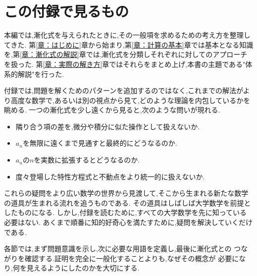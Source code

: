 \section{この付録で見るもの}

本編では,漸化式を与えられたときに,その一般項を求めるための考え方を整理してきた.
第\ref{章：はじめに}章から始まり,第\ref{章：計算の基本}章では基本となる知識を,第\ref{章：漸化式の解説}章では,漸化式を分類しそれぞれに対してのアプローチを扱った.
第\ref{章：実際の解き方}章ではそれらをまとめ上げ,本書の主題である"体系的解説"を行った.

付録では,問題を解くためのパターンを追加するのではなく,これまでの解法がより高度な数学で,あるいは別の視点から見て,どのような理論を内包しているかを眺める.
一つの漸化式を少し遠くから見ると,次のような問いが現れる.

\begin{itemize}
  \item 隣り合う項の差を,微分や積分に似た操作として扱えないか.
  \item $a_n$を無限に遠くまで見通すと最終的にどうなるのか.
  \item $a_n$の$n$を実数に拡張するとどうなるのか.
  \item 度々登場した特性方程式と不動点をより統一的に扱えないか.
\end{itemize}

これらの疑問をより広い数学の世界から見渡して,そこから生まれる新たな数学の道具が生まれる流れを追うものである.
その道具はしばしば大学数学を前提としたものになる.
しかし,付録を読むために,すべての大学数学を先に知っている必要はない.
あくまで順番に知的好奇心を満たすために,疑問を解決していくだけである.

各節では,まず問題意識を示し,次に必要な用語を定義し,最後に漸化式との
つながりを確認する.証明を完全に一般化することよりも,なぜその概念が
必要になり,何を見えるようにしたのかを大切にする.